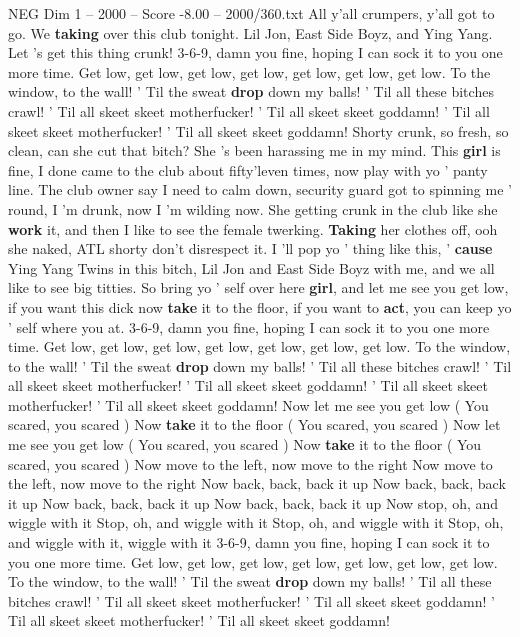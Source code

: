 \begin{textsample}{NEG Dim 1 – 2000 – Score -8.00 – 2000/360.txt}  \label{ex:f1_neg_014}
All y'all crumpers, y'all got to go.
We \textbf{taking} over this club tonight.
Lil Jon, East Side Boyz, and Ying Yang.
Let 's get this thing crunk! 3-6-9, damn you fine, hoping I can sock it to you one more time.
Get low, get low, get low, get low, get low, get low, get low.
To the window, to the wall! ' Til the sweat \textbf{drop} down my balls! ' Til all these bitches crawl! ' Til all skeet skeet motherfucker! ' Til all skeet skeet goddamn! ' Til all skeet skeet motherfucker! ' Til all skeet skeet goddamn!
Shorty crunk, so fresh, so clean, can she cut that bitch?
She 's been harassing me in my mind.
This \textbf{girl} is fine, I done came to the club about fifty'leven times, now play with yo ' panty line.
The club owner say I need to calm down, security guard got to spinning me ' round, I 'm drunk, now I 'm wilding now.
She getting crunk in the club like she \textbf{work} it, and then I like to see the female twerking. \textbf{Taking} her clothes off, ooh she naked, ATL shorty don't disrespect it.
I 'll pop yo ' thing like this, ' \textbf{cause} Ying Yang Twins in this bitch, Lil Jon and East Side Boyz with me, and we all like to see big titties.
So bring yo ' self over here \textbf{girl}, and let me see you get low, if you want this dick now \textbf{take} it to the floor, if you want to \textbf{act}, you can keep yo ' self where you at. 3-6-9, damn you fine, hoping I can sock it to you one more time.
Get low, get low, get low, get low, get low, get low, get low.
To the window, to the wall! ' Til the sweat \textbf{drop} down my balls! ' Til all these bitches crawl! ' Til all skeet skeet motherfucker! ' Til all skeet skeet goddamn! ' Til all skeet skeet motherfucker! ' Til all skeet skeet goddamn!
Now let me see you get low ( You scared, you scared ) Now \textbf{take} it to the floor ( You scared, you scared ) Now let me see you get low ( You scared, you scared ) Now \textbf{take} it to the floor ( You scared, you scared ) Now move to the left, now move to the right Now move to the left, now move to the right Now back, back, back it up Now back, back, back it up Now back, back, back it up Now back, back, back it up Now stop, oh, and wiggle with it Stop, oh, and wiggle with it Stop, oh, and wiggle with it Stop, oh, and wiggle with it, wiggle with it 3-6-9, damn you fine, hoping I can sock it to you one more time.
Get low, get low, get low, get low, get low, get low, get low.
To the window, to the wall! ' Til the sweat \textbf{drop} down my balls! ' Til all these bitches crawl! ' Til all skeet skeet motherfucker! ' Til all skeet skeet goddamn! ' Til all skeet skeet motherfucker! ' Til all skeet skeet goddamn!

\end{textsample}
